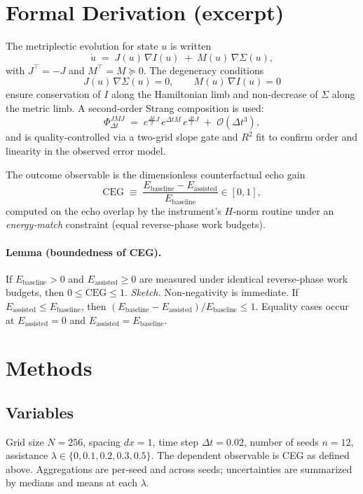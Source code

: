 \documentclass{article}
\newcommand{\CEG}{\mathrm{CEG}}
\begin{document}
\section{Formal Derivation (excerpt)}
The metriplectic evolution for state $u$ is written
\begin{equation}
  \dot{u} \;=\; J(u)\,\nabla I(u) \;+\; M(u)\,\nabla \Sigma(u),
\end{equation}
with $J^\top=-J$ and $M^\top=M\succeq 0$. The degeneracy conditions
\begin{equation}
  J(u)\,\nabla \Sigma(u)=0, \qquad M(u)\,\nabla I(u)=0
\end{equation}
ensure conservation of $I$ along the Hamiltonian limb and non‑decrease of $\Sigma$ along the metric limb. A second‑order Strang composition is used:
\begin{equation}
  \Phi_{\Delta t}^{JMJ} \;=\; e^{\frac{\Delta t}{2}J}\, e^{\Delta t M}\, e^{\frac{\Delta t}{2}J} \;+\; \mathcal{O}(\Delta t^{3}),
\end{equation}
and is quality‑controlled via a two‑grid slope gate and $R^2$ fit to confirm order and linearity in the observed error model.

The outcome observable is the dimensionless counterfactual echo gain
\begin{equation}
  \CEG \;\equiv\; \frac{E_{\mathrm{baseline}} - E_{\mathrm{assisted}}}{E_{\mathrm{baseline}}}\in[0,1],
\end{equation}
computed on the echo overlap by the instrument's $H$‑norm routine under an \emph{energy‑match} constraint (equal reverse‑phase work budgets).

\paragraph{Lemma (boundedness of CEG).}
If $E_{\mathrm{baseline}}>0$ and $E_{\mathrm{assisted}}\ge 0$ are measured under identical reverse‑phase work budgets, then $0 \le \CEG \le 1$. \emph{Sketch.} Non‑negativity is immediate. If $E_{\mathrm{assisted}}\le E_{\mathrm{baseline}}$, then $(E_{\mathrm{baseline}}-E_{\mathrm{assisted}})/E_{\mathrm{baseline}}\le 1$. Equality cases occur at $E_{\mathrm{assisted}}=0$ and $E_{\mathrm{assisted}}=E_{\mathrm{baseline}}$.

\section{Methods}
\subsection*{Variables}
Grid size $N=256$, spacing $dx=1$, time step $\Delta t = 0.02$, number of seeds $n=12$, assistance $\lambda \in \{0, 0.1, 0.2, 0.3, 0.5\}$. The dependent observable is CEG as defined above. Aggregations are per‑seed and across seeds; uncertainties are summarized by medians and means at each $\lambda$.
\end{document}

